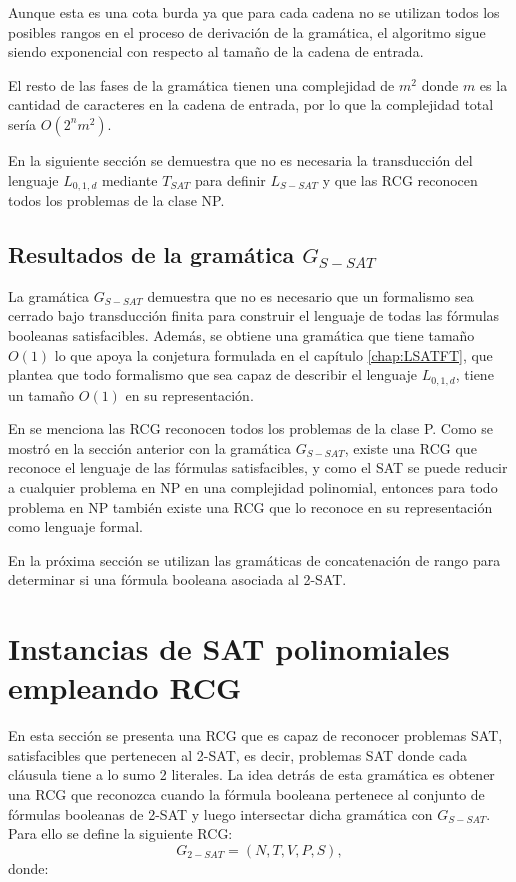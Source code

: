 Aunque esta es una cota burda ya que para cada cadena no se utilizan todos los posibles rangos en el proceso de derivación de la gramática, el algoritmo sigue siendo exponencial con respecto al tamaño de la cadena de entrada.

El resto de las fases de la gramática tienen una complejidad de $m^2$ donde $m$
es la cantidad de caracteres en la cadena de entrada, por lo que la complejidad total sería $O(2^nm^2)$.

En la siguiente sección se demuestra que no es necesaria la transducción del lenguaje $L_{0,1,d}$ mediante $T_{SAT}$
para definir $L_{S-SAT}$ y que las RCG reconocen todos los problemas de la clase NP.
\subsection{Resultados de la gramática $G_{S-SAT}$}

La gramática $G_{S-SAT}$ demuestra que no es necesario que un formalismo sea cerrado bajo transducción 
finita para construir el lenguaje de todas las fórmulas booleanas satisfacibles. Además, se obtiene una 
gramática que tiene tamaño $O(1)$ lo que apoya la conjetura formulada en el capítulo \ref{chap:LSATFT}, 
que plantea que todo formalismo que sea capaz de describir el lenguaje $L_{0,1,d}$, tiene un tamaño $O(1)$ en su representación.

En \cite{propertiesRCGBib2} se menciona las RCG reconocen todos los problemas de la clase P. Como se mostró en la sección anterior con la gramática $G_{S-SAT}$, existe una RCG que reconoce el lenguaje de las fórmulas satisfacibles, y como el SAT se puede reducir a cualquier problema en NP en una complejidad polinomial, entonces para todo problema en NP también existe una RCG que lo reconoce en su representación como lenguaje formal.

En la próxima sección se utilizan las gramáticas de concatenación de rango para determinar si una fórmula booleana asociada al 2-SAT.

\section{Instancias de SAT polinomiales empleando RCG}
\label{sec:pSATRCG}

En esta sección se presenta una RCG que es capaz de reconocer problemas SAT, satisfacibles que pertenecen al 2-SAT, es decir, problemas SAT donde cada cláusula tiene a lo sumo 2 literales. La idea detrás de esta gramática es obtener una RCG que reconozca cuando la fórmula booleana pertenece al conjunto de fórmulas booleanas de 2-SAT y luego intersectar dicha gramática con $G_{S-SAT}$.  Para ello se define la siguiente RCG:
\[
    G_{2-SAT} = (N, T, V, P, S),
\]
donde:

